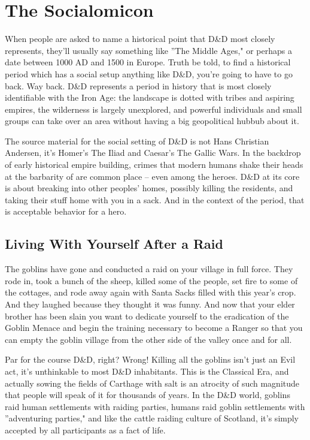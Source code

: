 
\section{The Socialomicon} %
\vspace*{-10pt}

When people are asked to name a historical point that D\&D most closely represents, they'll usually say something like ''The Middle Ages," or perhaps a date between 1000 AD and 1500 in Europe. Truth be told, to find a historical period which has a social setup anything like D\&D, you're going to have to go back. Way back. D\&D represents a period in history that is most closely identifiable with the Iron Age: the landscape is dotted with tribes and aspiring empires, the wilderness is largely unexplored, and powerful individuals and small groups can take over an area without having a big geopolitical hubbub about it.

The source material for the social setting of D\&D is not Hans Christian Andersen, it's Homer's The Iliad and Caesar's The Gallic Wars. In the backdrop of early historical empire building, crimes that modern humans shake their heads at the barbarity of are common place -- even among the heroes. D\&D at its core is about breaking into other peoples' homes, possibly killing the residents, and taking their stuff home with you in a sack. And in the context of the period, that is acceptable behavior for a hero.

\subsection{Living With Yourself After a Raid}

The goblins have gone and conducted a raid on your village in full force. They rode in, took a bunch of the sheep, killed some of the people, set fire to some of the cottages, and rode away again with Santa Sacks filled with this year's crop. And they laughed because they thought it was funny. And now that your elder brother has been slain you want to dedicate yourself to the eradication of the Goblin Menace and begin the training necessary to become a Ranger so that you can empty the goblin village from the other side of the valley once and for all.

Par for the course D\&D, right? Wrong! Killing all the goblins isn't just an Evil act, it's unthinkable to most D\&D inhabitants. This is the Classical Era, and actually sowing the fields of Carthage with salt is an atrocity of such magnitude that people will speak of it for thousands of years. In the D\&D world, goblins raid human settlements with raiding parties, humans raid goblin settlements with ''adventuring parties," and like the cattle raiding culture of Scotland, it's simply accepted by all participants as a fact of life.

